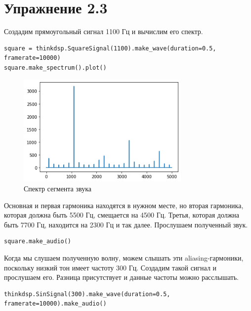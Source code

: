 \documentclass[a4paper,12pt]{report}
\begin{document}
\chapter{Упражнение 2.3}

Создадим прямоугольный сигнал 1100 Гц и вычислим его спектр.

\begin{lstlisting}[caption=Создание прямоугольного сигнала]
square = thinkdsp.SquareSignal(1100).make_wave(duration=0.5, framerate=10000)
square.make_spectrum().plot()
\end{lstlisting}

\begin{figure}[H]
        \centering
        \includegraphics[width=0.75\textwidth]{lab2_fig3_1.png}
        \caption{Спектр сегмента звука}
        \label{fig:lab2_fig3_1}
\end{figure}

Основная и первая гармоника находятся в нужном месте, но вторая гармоника, которая должна быть 5500 Гц, смещается на 4500 Гц. Третья, которая должна быть 7700 Гц, находится на 2300 Гц и так далее. Прослушаем полученный звук.

\begin{lstlisting}[caption=Воспроизведение прямоугольного сигнала]
square.make_audio()
\end{lstlisting}

Когда мы слушаем полученную волну, можем слышать эти aliasing-гармоники, поскольку низкий тон имеет частоту 300 Гц. Создадим такой сигнал и прослушаем его. Разница присутствует и данные частоты можно расслышать.

\begin{lstlisting}[caption=Создание и воспроизведение сигнала с пониженной частотой]
thinkdsp.SinSignal(300).make_wave(duration=0.5, framerate=10000).make_audio()
\end{lstlisting}
\end{document}

